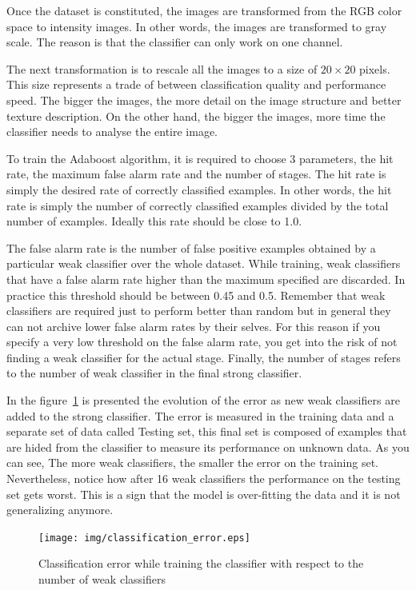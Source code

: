 Once the dataset is constituted, the images are transformed from the RGB color
space to intensity images. In other words, the images are transformed to gray
scale. The reason is that the classifier can only work on one channel.

The next transformation is to rescale all the images to a size of $20\times20$
pixels. This size represents a trade
of between classification quality and performance speed. The bigger the images,
the more detail on the image structure and better texture description. On the
other hand, the bigger the images, more time the classifier needs to analyse the
entire image.

To train the Adaboost algorithm, it is required to choose 3 parameters, the hit
rate, the maximum false alarm rate and the number of stages. The hit rate is
simply the desired rate of correctly classified examples. In other words, the
hit rate is simply the number of correctly classified examples divided by the
total number of examples. Ideally this rate should be close to 1.0.

The false alarm rate is the number of false positive examples obtained by a
particular weak classifier over the whole dataset. While training, weak
classifiers that have a false alarm rate higher than the maximum specified are
discarded. In practice this threshold should be between 0.45 and 0.5. Remember
that weak classifiers are required just to perform better than random but in
general they can not archive lower false alarm rates by their selves. For this
reason if you specify a very low threshold on the false alarm rate, you get into
the risk of not finding a weak classifier for the actual stage. Finally, the
number of stages refers to the number of weak classifier in the final strong
classifier.

In the figure~\ref{fig:classification-error} is presented the evolution of the
error as new weak classifiers are added to the strong classifier. The error is
measured in the training data and a separate set of data called Testing set,
this final set is composed of examples that are hided from the classifier to
measure its performance on unknown data. As you can see, The more weak
classifiers, the smaller the error on the training set. Nevertheless, notice how
after 16 weak classifiers the performance on the testing set gets worst. This is a
sign that the model is over-fitting the data and it is not generalizing anymore.

\begin{figure}[h]
\centering
\texttt{[image: img/classification\_error.eps]}
\caption{Classification error while training the classifier with respect to the
number of weak classifiers}
\label{fig:classification-error}
\end{figure} 


